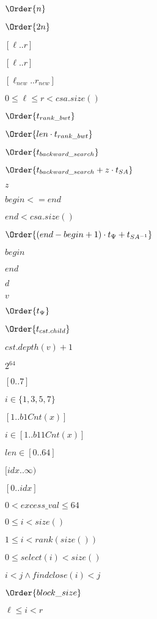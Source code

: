 \documentclass{article}
\begin{document}
$\Order{n}$
\pagebreak

$\Order{2n}$
\pagebreak

$[\ell..r]$
\pagebreak

$ [\ell..r]$
\pagebreak

$ [\ell_{new}..r_{new}] $
\pagebreak

$ 0 \leq \ell \leq r < csa.size() $
\pagebreak

$ \Order{ t_{rank\_bwt} } $
\pagebreak

$ \Order{ len \cdot t_{rank\_bwt} } $
\pagebreak

$ \Order{ t_{backward\_search} } $
\pagebreak

$ \Order{ t_{backward\_search} + z \cdot t_{SA} } $
\pagebreak

$z$
\pagebreak

$begin <= end$
\pagebreak

$ end < csa.size() $
\pagebreak

$ \Order{ (end-begin+1) \cdot t_{\Psi} + t_{SA^{-1}} } $
\pagebreak

$begin$
\pagebreak

$end$
\pagebreak

$d$
\pagebreak

$v$
\pagebreak

$ \Order{ t_{\Psi} } $
\pagebreak

$ \Order{t_{cst.child}} $
\pagebreak

$ cst.depth(v)+1$
\pagebreak

$2^64$
\pagebreak

$[0..7]$
\pagebreak

$i\in \{1,3,5,7\}$
\pagebreak

$[1..b1Cnt(x)]$
\pagebreak

$i \in [1..b11Cnt(x)]$
\pagebreak

$ len \in [0..64] $
\pagebreak

$[idx..\infty )$
\pagebreak

$[0..idx]$
\pagebreak

$0<excess\_val \leq 64 $
\pagebreak

$ 0\leq i < size() $
\pagebreak

$1\leq i < rank(size())$
\pagebreak

$ 0\leq select(i) < size() $
\pagebreak

$ i<j \wedge findclose(i) < j $
\pagebreak

$ \Order{block\_size} $
\pagebreak

$ \ell \leq i < r $
\pagebreak
\end{document}
